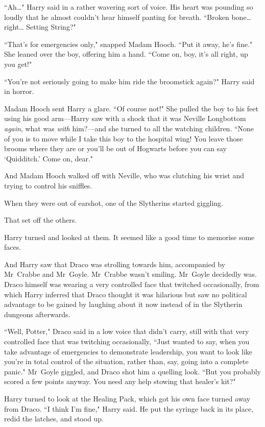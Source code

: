``Ah{\ldots}" Harry said in a rather wavering sort of voice. His heart was pounding so loudly that he almost couldn't hear himself panting for breath. ``Broken bone{\ldots} right{\ldots} Setting String?"

``That's for emergencies only," snapped Madam Hooch. ``Put it away, he's fine." She leaned over the boy, offering him a hand. ``Come on, boy, it's all right, up you get!"

``You're not seriously going to make him ride the broomstick again?" Harry said in horror.

Madam Hooch sent Harry a glare. ``Of course not!" She pulled the boy to his feet using his good arm—Harry saw with a shock that it was Neville Longbottom \emph{again}, what was \emph{with} him?—and she turned to all the watching children. ``None of you is to move while I take this boy to the hospital wing! You leave those brooms where they are or you'll be out of Hogwarts before you can say `Quidditch.' Come on, dear."

And Madam Hooch walked off with Neville, who was clutching his wrist and trying to control his sniffles.

When they were out of earshot, one of the Slytherins started giggling.

That set off the others.

Harry turned and looked at them. It seemed like a good time to memorise some faces.

And Harry saw that Draco was strolling towards him, accompanied by Mr~Crabbe and Mr~Goyle. Mr~Crabbe wasn't smiling. Mr~Goyle decidedly was. Draco himself was wearing a very controlled face that twitched occasionally, from which Harry inferred that Draco thought it was hilarious but saw no political advantage to be gained by laughing about it now instead of in the Slytherin dungeons afterwards.

``Well, Potter," Draco said in a low voice that didn't carry, still with that very controlled face that was twitching occasionally, ``Just wanted to say, when you take advantage of emergencies to demonstrate leadership, you want to look like you're in total control of the situation, rather than, say, going into a complete panic." Mr~Goyle giggled, and Draco shot him a quelling look. ``But you probably scored a few points anyway. You need any help stowing that healer's kit?"

Harry turned to look at the Healing Pack, which got his own face turned away from Draco. ``I think I'm fine," Harry said. He put the syringe back in its place, redid the latches, and stood up.

